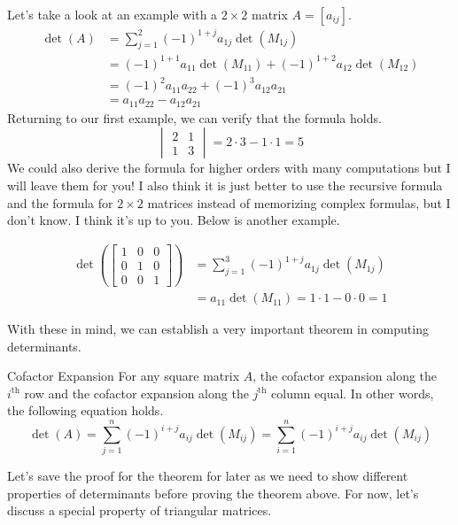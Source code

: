 \documentclass[../main.tex]{subfiles}
\begin{document}
Let's take a look at an example with a $2 \times 2$ matrix
$A = [a_{ij}]$.
\begin{align*}
    \det(A)
    &= \sum_{j=1}^2 (-1)^{1 + j} a_{1j} \det(M_{1j}) \\
    &= (-1)^{1 + 1} a_{11} \det(M_{11}) +
        (-1)^{1 + 2} a_{12} \det(M_{12}) \\
    &= (-1)^{2} a_{11} a_{22} + (-1)^{3} a_{12} a_{21} \\
    &= a_{11} a_{22} - a_{12} a_{21}
\end{align*}
Returning to our first example, we can verify that the formula holds.
\[
\begin{vmatrix}
    2 & 1 \\
    1 & 3
\end{vmatrix}
= 2 \cdot 3 - 1 \cdot 1
= 5
\]
We could also derive the formula for higher orders with many
computations but I will leave them for you! I also think it is
just better to use the recursive formula and the formula for
$2 \times 2$ matrices instead of memorizing complex formulas,
but I don't know. I think it's up to you. Below is another
example.

\begin{align*}
    \det\left(
        \begin{bmatrix}
            1 & 0 & 0 \\
            0 & 1 & 0 \\
            0 & 0 & 1
        \end{bmatrix}
    \right)
    &= \sum_{j=1}^3 (-1)^{1 + j} a_{1j} \det(M_{1j}) \\
    &= a_{11} \det(M_{11})
    = 1 \cdot 1 - 0 \cdot 0 = 1
\end{align*}

With these in mind, we can establish a very important theorem in
computing determinants.

\begin{theorem}{Cofactor Expansion}
For any square matrix $A$, the cofactor expansion along the
$i^\text{th}$ row and the cofactor expansion along the $j^\text{th}$
column equal. In other words, the following equation holds.
\[
\det(A)
= \sum_{j=1}^n (-1)^{i + j} a_{ij} \det(M_{ij})
= \sum_{i=1}^n (-1)^{i + j} a_{ij} \det(M_{ij})
\]
\end{theorem}

Let's save the proof for the theorem for later as we need to show
different properties of determinants before proving the theorem
above. For now, let's discuss a special property of triangular
matrices.
\end{document}
